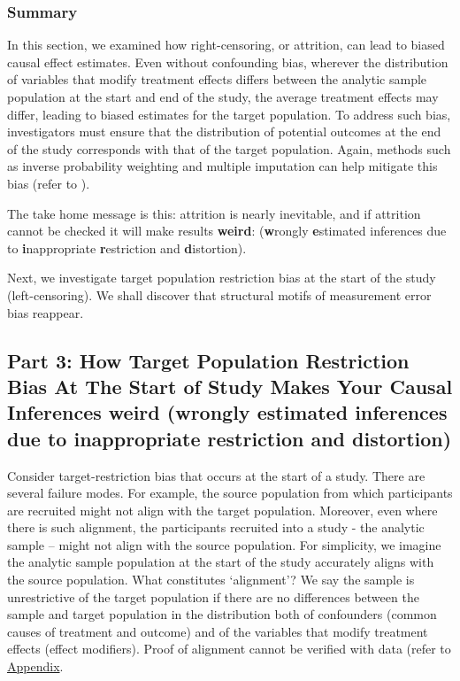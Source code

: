 \documentclass[
  single column]{article}
\begin{document}
\subsubsection{Summary}\label{summary-1}

In this section, we examined how right-censoring, or attrition, can lead
to biased causal effect estimates. Even without confounding bias,
wherever the distribution of variables that modify treatment effects
differs between the analytic sample population at the start and end of
the study, the average treatment effects may differ, leading to biased
estimates for the target population. To address such bias, investigators
must ensure that the distribution of potential outcomes at the end of
the study corresponds with that of the target population. Again, methods
such as inverse probability weighting and multiple imputation can help
mitigate this bias (refer to
).

The take home message is this: attrition is nearly inevitable, and if
attrition cannot be checked it will make results \textbf{weird}:
(\textbf{w}rongly \textbf{e}stimated inferences due to
\textbf{i}nappropriate \textbf{r}estriction and \textbf{d}istortion).

Next, we investigate target population restriction bias at the start of
the study (left-censoring). We shall discover that structural motifs of
measurement error bias reappear.

\newpage{}

\subsection{\texorpdfstring{Part 3: How Target Population Restriction
Bias At The Start of Study Makes Your Causal Inferences weird
(\textbf{w}rongly \textbf{e}stimated inferences due to
\textbf{i}nappropriate \textbf{r}estriction and
\textbf{d}istortion)}{Part 3: How Target Population Restriction Bias At The Start of Study Makes Your Causal Inferences weird (wrongly estimated inferences due to inappropriate restriction and distortion)}}\label{id-sec-3}

Consider target-restriction bias that occurs at the start of a study.
There are several failure modes. For example, the source population from
which participants are recruited might not align with the target
population. Moreover, even where there is such alignment, the
participants recruited into a study - the analytic sample -- might not
align with the source population. For simplicity, we imagine the
analytic sample population at the start of the study accurately aligns
with the source population. What constitutes `alignment'? We say the
sample is unrestrictive of the target population if there are no
differences between the sample and target population in the distribution
both of confounders (common causes of treatment and outcome) and of the
variables that modify treatment effects (effect modifiers). Proof of
alignment cannot be verified with data (refer to
\hyperref[id-app-c]{Appendix}.
\end{document}
